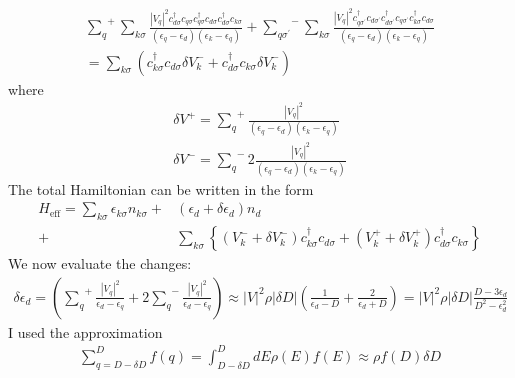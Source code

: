 \begin{equation}\begin{aligned}
{\sum_{q}}^+\sum_{k\sigma} \frac{|V_q|^2c^\dagger_{d\sigma}c_{q\sigma}c^\dagger_{q\sigma}c_{d\sigma}c^\dagger_{d\sigma}c_{k\sigma}}{(\epsilon_q - \epsilon_d)(\epsilon_k - \epsilon_q)} + {\sum_{q\sigma^\prime}}^-\sum_{k\sigma} \frac{|V_q|^2c^\dagger_{q\sigma^\prime}c_{d\sigma^\prime}c^\dagger_{d\sigma^\prime}c_{q\sigma^\prime}c^\dagger_{k\sigma}c_{d\sigma}}{(\epsilon_q - \epsilon_d)(\epsilon_k - \epsilon_q)}\\
=\sum_{k\sigma}\left(c^\dagger_{k\sigma}c_{d\sigma} \delta V^-_k + c^\dagger_{d\sigma}c_{k\sigma}\delta V^-_k\right)
\end{aligned}\end{equation}
where
\begin{equation}\begin{aligned}
\delta V^+ = {\sum_q}^+ \frac{|V_q|^2}{(\epsilon_q - \epsilon_d)(\epsilon_k - \epsilon_q)}\\
\delta V^- = {\sum_q}^- 2\frac{|V_q|^2}{(\epsilon_q - \epsilon_d)(\epsilon_k - \epsilon_q)}
\end{aligned}\end{equation}
The total Hamiltonian can be written in the form
\begin{equation}\begin{aligned}
	H_\text{eff} = \sum_{k\sigma}\epsilon_{k\sigma} n_{k\sigma} + &\left(\epsilon_d + \delta \epsilon_d\right)n_d \\
	+ &\sum_{k\sigma}\left\{\left(V^-_k + \delta V^-_k\right) c^\dagger_{k\sigma}c_{d\sigma} + \left(V^+_k + \delta V^+_k\right) c^\dagger_{d\sigma}c_{k\sigma}\right\}
					     \end{aligned}\end{equation}
We now evaluate the changes:
\begin{equation}\begin{aligned}
	\delta \epsilon_d = \left({\sum_q}^+\frac{|V_q|^2 }{\epsilon_d - \epsilon_q} + 2{\sum_q}^-\frac{|V_q|^2}{\epsilon_d - \epsilon_q}\right) \approx |V|^2 \rho |\delta D| \left(\frac{1}{\epsilon_d - D} + \frac{2}{\epsilon_d + D}\right) =|V|^2 \rho |\delta D|\frac{D - 3\epsilon_d}{D^2 - \epsilon_d^2}
\end{aligned}\end{equation}
I used the approximation
\begin{equation}\begin{aligned}
\sum_{q=D-\delta D}^D f(q) = \int_{D- \delta D}^D dE \rho(E) f(E) \approx \rho f(D) \delta D
\end{aligned}\end{equation}
